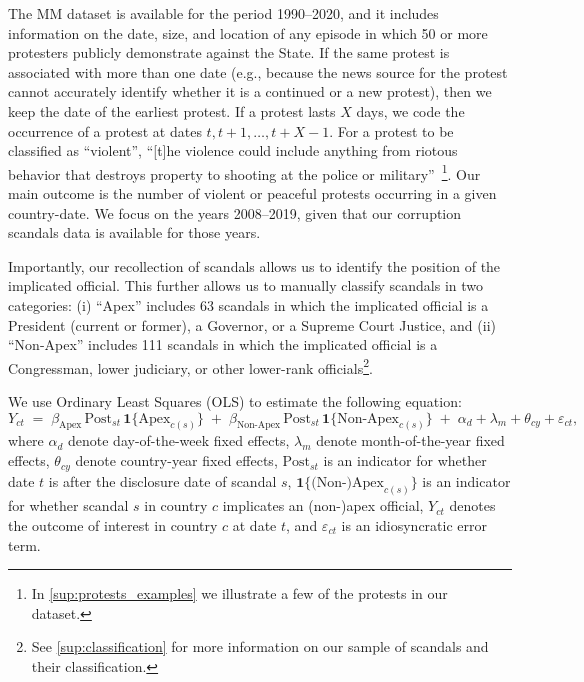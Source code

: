 \documentclass[11pt]{article}
\let\mathbetasym\beta
\renewcommand{\beta}{\ensuremath{\mathbetasym}}
\begin{document}
The MM dataset is available for the period 1990--2020, and it includes information on the date, size, and location of any episode in which 50 or more protesters publicly demonstrate against the State.  If the same protest is associated with more than one date (e.g., because the news source for the protest cannot accurately identify whether it is a continued or a new protest), then we keep the date of the earliest protest. If a protest lasts $X$ days, we code the occurrence of a protest at dates $t, t+1, \dots, t+X-1$. For a protest to be classified as ``violent'', ``[t]he violence could include anything from riotous behavior that destroys property to shooting at the police or military''~\citep{clark2016mass}\footnote{In \autoref{sup:protests_examples} we illustrate a few of the protests in our dataset.}. Our main outcome is the number of violent or peaceful protests occurring in a given country-date. We focus on the years 2008--2019, given that our corruption scandals data is available for those years.

Importantly, our recollection of scandals allows us to identify the position of the implicated official. This further allows us to manually classify scandals in two categories: (i) ``Apex'' includes 63 scandals in which the implicated official is a President (current or former), a Governor, or a Supreme Court Justice, and (ii) ``Non-Apex'' includes 111 scandals in which the implicated official is a Congressman, lower judiciary, or other lower-rank officials\footnote{See \autoref{sup:classification} for more information on our sample of scandals and their classification.}.

We use Ordinary Least Squares (OLS) to estimate the following equation:
\begin{equation}
\label{eq:main}
    Y_{ct} \;=\; \beta_{\text{Apex}}\, \mathrm{Post}_{st}\, \mathbf{1}\{\text{Apex}_{c(s)}\}
    \;+\; \beta_{\text{Non-Apex}}\, \mathrm{Post}_{st}\, \mathbf{1}\{\text{Non-Apex}_{c(s)}\}
    \;+\; \alpha_d + \lambda_m + \theta_{cy} + \varepsilon_{ct},
\end{equation}
where $\alpha_d$ denote day-of-the-week fixed effects, $\lambda_m$ denote month-of-the-year fixed effects, $\theta_{cy}$ denote country-year fixed effects, $\text{Post}_{st}$ is an indicator for whether date $t$ is after the disclosure date of scandal $s$, $\mathbf{1}\{\text{(Non-)Apex}_{c(s)}\}$ is an indicator for whether scandal $s$ in country $c$ implicates an (non-)apex official, $Y_{ct}$ denotes the outcome of interest in country $c$ at date $t$, and $\varepsilon_{ct}$ is an idiosyncratic error term.
\end{document}
